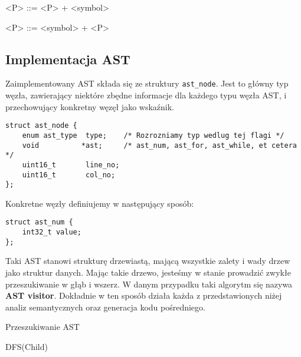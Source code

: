			\begin{grammar}
			    <P> ::= <P> + <symbol>
	
			    <P> ::= <symbol> + <P>
			\end{grammar}

		\subsection{Implementacja AST}

			Zaimplementowany AST składa się ze struktury \texttt{ast_node}. Jest to główny typ
			węzła, zawierający niektóre zbędne informacje dla każdego typu węzła AST, i przechowujący
			konkretny węzęł jako wskaźnik.

			\spacing

\begin{lstlisting}[label={lst:ast-node}]
struct ast_node {
	enum ast_type  type;    /* Rozrozniamy typ wedlug tej flagi */
	void          *ast;     /* ast_num, ast_for, ast_while, et cetera */
	uint16_t       line_no;
	uint16_t       col_no;
};
\end{lstlisting}
			
			\spacing
			
			Konkretne węzły definiujemy w następujący sposób:

			\spacing

\begin{lstlisting}[label={lst:ast-concrete-node}]
struct ast_num {
	int32_t value;
};
\end{lstlisting}
			
			\spacing
			
			Taki AST stanowi strukturę drzewiastą, mającą wszystkie zalety i wady drzew jako struktur
			danych. Mając takie drzewo, jesteśmy w stanie prowadzić zwykłe przeszukiwanie w głąb
			i wszerz. W danym przypadku taki algorytm się nazywa \textbf{AST visitor}. Dokładnie w ten
			sposób działa każda z przedstawionych niżej analiz semantycznych
			oraz generacja kodu pośredniego.

			\spacing

			\begin{algorithm}
				\caption{Przeszukiwanie AST}
				\begin{algorithmic}[1]

						\State DFS(Child)
					\EndFor
				\EndProcedure

				\end{algorithmic}
			\end{algorithm}

